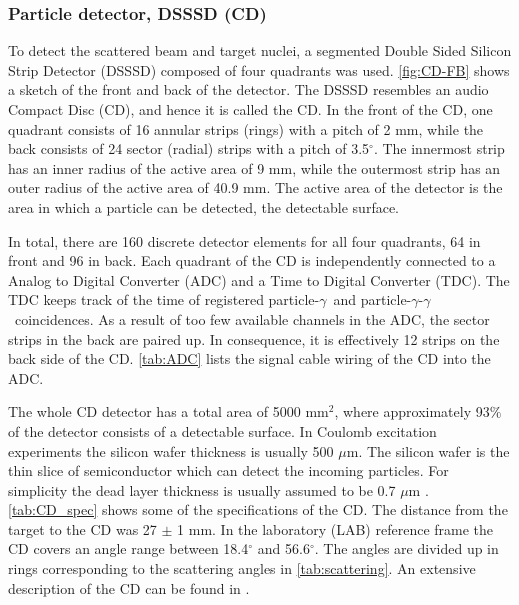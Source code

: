 \documentclass[twoside,english]{uiofysmaster/uiofysmaster}
\newcommand{\ga}{$\gamma$}
\let\orgautoref\autoref
\renewcommand{\autoref}
        {%
		 \def\sectionautorefname{Section}%
		 \def\subsectionautorefname{Section}%
		 \def\subsubsectionautorefname{Section}%
		 \def\chapterautorefname{Chapter}%
          \orgautoref}
\begin{document}
\subsubsection{Particle detector, DSSSD (CD)}
To detect the scattered beam and target nuclei, a segmented Double Sided Silicon Strip Detector (DSSSD) composed of four quadrants was used. 
\autoref{fig:CD-FB} shows a sketch of the front and back of the detector. 
The DSSSD resembles an audio Compact Disc (CD), and hence it is called the CD. 
In the front of the CD, one quadrant consists of 16 annular strips (rings) with a pitch of 2 mm, while the back consists of 24 sector (radial) strips with a pitch of 3.5$^\circ$. 
The innermost strip has an inner radius of the active area of 9 mm, while the outermost strip has an outer radius of the active area of 40.9 mm. 
The active area of the detector is the area in which a particle can be detected, the detectable surface. 

In total, there are 160 discrete detector elements for all four quadrants, 64 in front and 96 in back. 
Each quadrant of the CD is independently connected to a Analog to Digital Converter (ADC) and a Time to Digital Converter (TDC). 
The TDC keeps track of the time of registered particle-\ga\ and particle-\ga-\ga\ coincidences. 
As a result of too few available channels in the ADC, the sector strips in the back are paired up.
In consequence, it is effectively 12 strips on the back side of the CD. 
\autoref{tab:ADC} lists the signal cable wiring of the CD into the ADC. 

The whole CD detector has a total area of 5000 mm$^2$, where approximately 93$\%$ of the detector consists of a detectable surface. 
In Coulomb excitation experiments the silicon wafer thickness is usually 500 $\mu$m.
The silicon wafer is the thin slice of semiconductor which can detect the incoming particles. 
For simplicity the dead layer thickness is usually assumed to be 0.7 $\mu$m \cite{NWarr-CD, MB-spect}. 
\autoref{tab:CD_spec} shows some of the specifications of the CD.  
The distance from the target to the CD was 27 $\pm$ 1 mm. 
In the laboratory (LAB) reference frame the CD covers an angle range between 18.4$^\circ$ and 56.6$^\circ$. 
The angles are divided up in rings corresponding to the scattering angles in \autoref{tab:scattering}.
An extensive description of the CD can be found in \cite{CD-DSSSD}.

\end{document}
